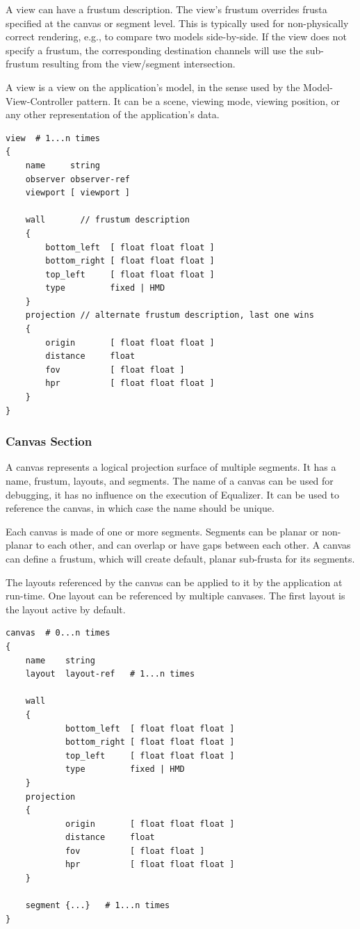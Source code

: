 \documentclass[10pt,a4]{scrartcl}
\begin{document}
A view can have a frustum description. The view's frustum overrides
frusta specified at the canvas or segment level. This is typically used
for non-physically correct rendering, e.g., to compare two models
side-by-side. If the view does not specify a frustum, the corresponding
destination channels will use the sub-frustum resulting from the
view/segment intersection.

A view is a view on the application's model, in the sense used by the
Model-View-Controller pattern. It can be a scene, viewing mode, viewing
position, or any other representation of the application's data.

{\footnotesize\begin{lstlisting}
view  # 1...n times
{
    name     string
    observer observer-ref
    viewport [ viewport ]

    wall       // frustum description
    {
        bottom_left  [ float float float ]
        bottom_right [ float float float ]
        top_left     [ float float float ]
        type         fixed | HMD
    }
    projection // alternate frustum description, last one wins
    {
        origin       [ float float float ]
        distance     float
        fov          [ float float ]
        hpr          [ float float float ]
    }
}
\end{lstlisting}}

\subsubsection{Canvas Section}

A canvas represents a logical projection surface of multiple
segments. It has a name, frustum, layouts, and segments. The name of a
canvas can be used for debugging, it has no influence on the execution
of Equalizer. It can be used to reference the canvas, in which case the
name should be unique.

Each canvas is made of one or more segments. Segments can be planar or
non-planar to each other, and can overlap or have gaps between each
other. A canvas can define a frustum, which will create default, planar
sub-frusta for its segments.

The layouts referenced by the canvas can be applied to it by the
application at run-time. One layout can be referenced by multiple
canvases. The first layout is the layout active by default.

{\footnotesize\begin{lstlisting}
canvas  # 0...n times
{
    name    string
    layout  layout-ref   # 1...n times

    wall       
    {
            bottom_left  [ float float float ]
            bottom_right [ float float float ]
            top_left     [ float float float ]
            type         fixed | HMD
    }
    projection
    {
            origin       [ float float float ]
            distance     float
            fov          [ float float ]
            hpr          [ float float float ]
    }
    
    segment {...}   # 1...n times
}
\end{lstlisting}}
\end{document}
